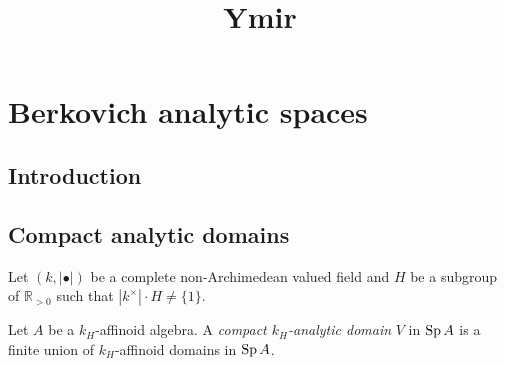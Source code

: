 
\title{Ymir}

\maketitle
\tableofcontents

\chapter*{Berkovich analytic spaces}\label{chap-Berkovich}

\section{Introduction}\label{sec-introduction}

\section{Compact analytic domains}
Let $(k,|\bullet|)$ be a complete non-Archimedean valued field and $H$ be a subgroup of $\mathbb{R}_{>0}$ such that $|k^{\times}|\cdot H\neq \{1\}$.

\begin{definition}
Let $A$ be a $k_H$-affinoid algebra. A \emph{compact $k_H$-analytic domain} $V$ in $\operatorname{Sp} A$ is a finite union of $k_H$-affinoid domains in $\operatorname{Sp} A$.    
\end{definition}


